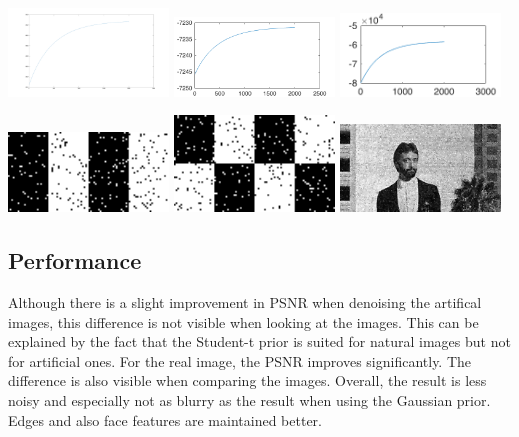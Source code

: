 \documentclass[a4paper,11pt, final]{scrartcl}
\begin{document}
{
\centering 
\includegraphics[width=0.32\textwidth]{ex4_stripes_mrf_student_posterior.png}
\includegraphics[width=0.32\textwidth]{ex4_checker_mrf_student_posterior.png}
\includegraphics[width=0.32\textwidth]{ex4_image_mrf_student_posterior.png}
}

\vspace{1cm}

{
\centering 
\includegraphics[width=0.32\textwidth]{ex4_stripes_mrf_student_filtered.png}
\includegraphics[width=0.32\textwidth]{ex4_checker_mrf_student_filtered.png}
\includegraphics[width=0.32\textwidth]{ex4_image_mrf_student_filtered.png}
}

\subsection*{Performance}
Although there is a slight improvement in PSNR when denoising the artifical images, this difference is not visible when looking at the images. This can be explained by the fact that the Student-t prior is suited for natural images but not for artificial ones.
For the real image, the PSNR improves significantly. The difference is also visible when comparing the images. Overall, the result is less noisy and especially not as blurry as the result when using the Gaussian prior. Edges and also face features are maintained better.
\end{document}
